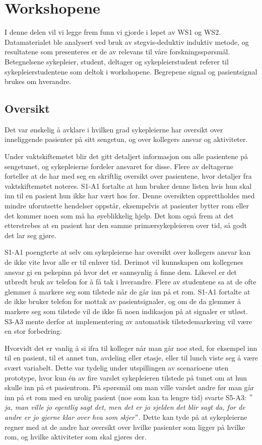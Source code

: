 \section{Workshopene}
\label{ws}
I denne delen vil vi legge frem funn vi gjorde i løpet av WS1 og WS2. Datamaterialet ble analysert ved bruk av stegvis-deduktiv induktiv metode, og resultatene som presenteres er de av relevans til våre forskningsspørsmål. Betegnelsene sykepleier, student, deltager og sykepleierstudent referer til sykepleierstudentene som deltok i workshopene. Begrepene signal og pasientsignal brukes om hverandre.

\subsection{Oversikt}
Det var ønskelig å avklare i hvilken grad sykepleierne har oversikt over inneliggende pasienter på sitt sengetun, og over kollegers ansvar og aktiviteter.

\noindent
Under vaktskiftemøtet blir det gitt detaljert informasjon om alle pasientene på sengetunet, og sykepleierne fordeler ansvaret for disse. Flere av deltagerne forteller at de har med seg en skriftlig oversikt over pasientene, hvor detaljer fra vaktskiftemøtet noteres. S1-A1 fortalte at hun bruker denne listen hvis hun skal inn til en pasient hun ikke har vært hos før. Denne oversikten opprettholdes med mindre uforutsette hendelser oppstår, eksempelvis at pasienter bytter rom eller det kommer noen som må ha øyeblikkelig hjelp. Det kom også frem at det etterstrebes at en pasient har den samme primærsykepleieren over tid, så godt det lar seg gjøre.

\noindent
S1-A1 poengterte at selv om sykepleierne har oversikt over kollegers ansvar kan de ikke vite hvor alle er til enhver tid. Derimot vil kunnskapen om kollegenes ansvar gi en pekepinn på hvor det er sannsynlig å finne dem. Likevel er det utbredt bruk av telefon for å få tak i hverandre. Flere av studentene sa at de ofte glemmer å markere seg som tilstede når de går inn på et rom. S1-A1 fortalte at de ikke bruker telefon for mottak av pasientsignaler, og om de da glemmer å markere seg som tilstede vil de ikke få noen indikasjon på at signaler er utløst. S3-A3 mente derfor at implementering av automatisk tilstedemarkering vil være en stor forbedring. 

\noindent
Hvorvidt det er vanlig å si ifra til kolleger når man går noe sted, for eksempel inn til en pasient, til et annet tun, avdeling eller etasje, eller til lunch viste seg å være svært variabelt. Dette var tydelig under utspillingen av scenarioene uten prototype, hvor kun én av fire varslet sykepleieren tilstede på tunet om at hun skulle inn på et pasientrom. På spørsmål om man ville varslet andre før man går inn på et rom med en urolig pasient (noe som kan ta lengre tid) svarte S5-A3: \emph{$"$ja, man ville jo egentlig sagt det, men det er jo sjelden det blir sagt da, for de andre er jo gjerne klar over hva som skjer$"$}. Dette kan tyde på at sykepleierne regner med at de andre har oversikt over hvilke pasienter som ligger på hvilke rom, og hvilke aktiviteter som skal gjøres der.

